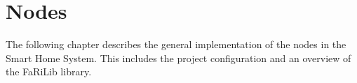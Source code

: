 \chapter{Nodes} \label{sec:nodes}
The following chapter describes the general implementation of the nodes in the 
Smart Home System. This includes the project configuration
and an overview of the FaRiLib library.








    
